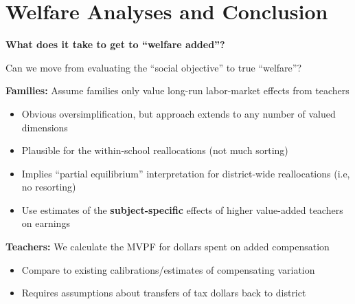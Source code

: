 \documentclass[t,aspectratio=169,11pt,presentation]{beamer}
\newenvironment{wideitemize}{\itemize\addtolength{\itemsep}{14pt}}{\enditemize}
\begin{document}
\section{Welfare Analyses and Conclusion}


\begin{frame}{\textbf{What does it take to get to ``welfare added''?}}
\begin{wideitemize}
    \item Can we move from evaluating the ``social objective'' to true ``welfare''?



    \item \textbf{Families:} Assume families only value long-run labor-market effects from teachers
    \begin{itemize}
        \item<3-> Obvious oversimplification, but approach extends to any number of valued dimensions
        \item<4-> Plausible for the within-school reallocations (not much sorting)
        \item<5-> Implies ``partial equilibrium'' interpretation for district-wide reallocations (i.e, no resorting) 

        
        \item<7-> Use estimates of the \textbf{subject-specific} effects of higher value-added teachers on earnings 

        {\tiny \color{gray} \citep[]{chetty2014measuring2}}
    \end{itemize}

    \item<8-> \textbf{Teachers:} We calculate the MVPF for dollars spent on added compensation
    \begin{itemize}
        \item<9-> Compare to existing calibrations/estimates of compensating variation
        
        {\tiny \color{gray} \citep[]{rothstein2015teacher,bates2022teacher}}
        \item<10-> Requires assumptions about transfers of tax dollars back to district
    \end{itemize}


\end{wideitemize}
\end{frame}
\end{document}

